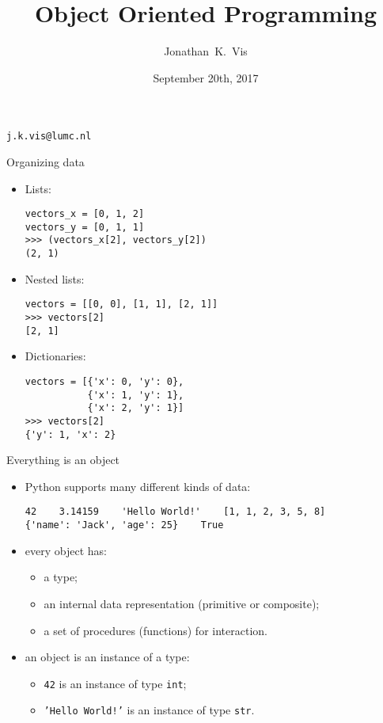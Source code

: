 \documentclass{beamer}
\author{Jonathan~K.~Vis}
\institute[LUMC]{Dept. of Human Genetics, Leiden University Medical Center}
\date{September 20th, 2017}
\title{Object Oriented Programming}
\begin{document}
\beamertemplatenavigationsymbolsempty

\begin{frame}
\titlepage
\vfill
\hfill \textcolor{pms280_compl}{\texttt{j.k.vis@lumc.nl}}
\end{frame}

\begin{frame}[fragile]{Organizing data}

\begin{itemize}
\item Lists:
\begin{verbatim}
vectors_x = [0, 1, 2]
vectors_y = [0, 1, 1]
>>> (vectors_x[2], vectors_y[2])
(2, 1)
\end{verbatim}

\item Nested lists:
\begin{verbatim}
vectors = [[0, 0], [1, 1], [2, 1]]
>>> vectors[2]
[2, 1]
\end{verbatim}

\item Dictionaries:
\begin{verbatim}
vectors = [{'x': 0, 'y': 0},
           {'x': 1, 'y': 1},
           {'x': 2, 'y': 1}]
>>> vectors[2]
{'y': 1, 'x': 2}
\end{verbatim}
\end{itemize}
\end{frame}

\begin{frame}[fragile]{Everything is an object}
\begin{itemize}
\item Python supports many different kinds of data:
\begin{verbatim}
42    3.14159    'Hello World!'    [1, 1, 2, 3, 5, 8]
{'name': 'Jack', 'age': 25}    True
\end{verbatim}

\item every \textcolor{pms280_compl}{object} has:
\begin{itemize}
\item a \textcolor{pms280_compl}{type};
\item an internal \textcolor{pms280_compl}{data representation}
(primitive or composite);
\item a set of \textcolor{pms280_compl}{procedures} (functions) for
interaction.
\end{itemize}

\item an object is an \textcolor{pms280_compl}{instance} of a type:
\begin{itemize}
\item \texttt{42} is an instance of type
\texttt{int};
\item \texttt{'Hello World!'} is an instance of type
\texttt{str}.
\end{itemize}
\end{itemize}
\end{frame}
\end{document}
